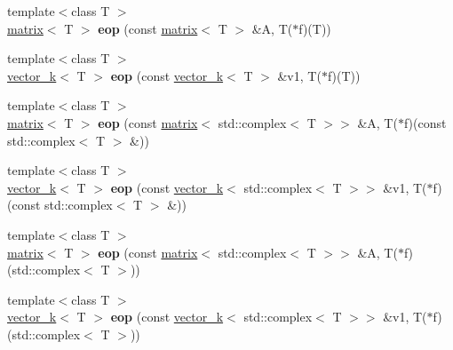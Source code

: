\begin{DoxyCompactItemize}
\item 
\hypertarget{namespacekeycpp_a3a1ba458353cfecef659b40e446baaf0}{{\footnotesize template$<$class T $>$ }\\\hyperlink{classkeycpp_1_1matrix}{matrix}$<$ T $>$ {\bfseries eop} (const \hyperlink{classkeycpp_1_1matrix}{matrix}$<$ T $>$ \&A, T($\ast$f)(T))}\label{namespacekeycpp_a3a1ba458353cfecef659b40e446baaf0}

\item 
\hypertarget{namespacekeycpp_a48fb1c8a89210ed78554ecd0bed92a59}{{\footnotesize template$<$class T $>$ }\\\hyperlink{classkeycpp_1_1vector__k}{vector\-\_\-k}$<$ T $>$ {\bfseries eop} (const \hyperlink{classkeycpp_1_1vector__k}{vector\-\_\-k}$<$ T $>$ \&v1, T($\ast$f)(T))}\label{namespacekeycpp_a48fb1c8a89210ed78554ecd0bed92a59}

\item 
\hypertarget{namespacekeycpp_a5afc215befa38bf47fb52cff33794ebe}{{\footnotesize template$<$class T $>$ }\\\hyperlink{classkeycpp_1_1matrix}{matrix}$<$ T $>$ {\bfseries eop} (const \hyperlink{classkeycpp_1_1matrix}{matrix}$<$ std\-::complex$<$ T $>$$>$ \&A, T($\ast$f)(const std\-::complex$<$ T $>$ \&))}\label{namespacekeycpp_a5afc215befa38bf47fb52cff33794ebe}

\item 
\hypertarget{namespacekeycpp_afc7610588aa92335352b2796ebdd359d}{{\footnotesize template$<$class T $>$ }\\\hyperlink{classkeycpp_1_1vector__k}{vector\-\_\-k}$<$ T $>$ {\bfseries eop} (const \hyperlink{classkeycpp_1_1vector__k}{vector\-\_\-k}$<$ std\-::complex$<$ T $>$$>$ \&v1, T($\ast$f)(const std\-::complex$<$ T $>$ \&))}\label{namespacekeycpp_afc7610588aa92335352b2796ebdd359d}

\item 
\hypertarget{namespacekeycpp_ae14b016d01024e738c3110299ee58666}{{\footnotesize template$<$class T $>$ }\\\hyperlink{classkeycpp_1_1matrix}{matrix}$<$ T $>$ {\bfseries eop} (const \hyperlink{classkeycpp_1_1matrix}{matrix}$<$ std\-::complex$<$ T $>$$>$ \&A, T($\ast$f)(std\-::complex$<$ T $>$))}\label{namespacekeycpp_ae14b016d01024e738c3110299ee58666}

\item 
\hypertarget{namespacekeycpp_a31115adc10089fbbc732d59362890af2}{{\footnotesize template$<$class T $>$ }\\\hyperlink{classkeycpp_1_1vector__k}{vector\-\_\-k}$<$ T $>$ {\bfseries eop} (const \hyperlink{classkeycpp_1_1vector__k}{vector\-\_\-k}$<$ std\-::complex$<$ T $>$$>$ \&v1, T($\ast$f)(std\-::complex$<$ T $>$))}\label{namespacekeycpp_a31115adc10089fbbc732d59362890af2}


\end{DoxyCompactItemize}
